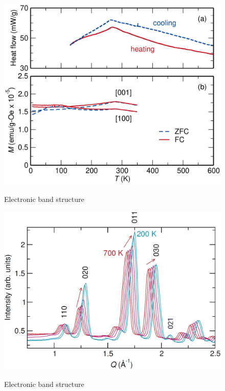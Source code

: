 \documentclass[11pt,edeposit,draftthesis]{uiucthesis2020}
\begin{document}
\begin{mainmatter}
\begin{figure}
\centering\includegraphics[width=\columnwidth]{figures/ch5/dsc-mpms_norm_cropped.pdf} \\
\caption{\label{fig:dsc_mpms}
Electronic band structure
}
\end{figure}

\begin{figure}
\centering\includegraphics[width=\columnwidth]{figures/ch5/WAND_data.png} \\
\caption{\label{fig:WAND_data}
Electronic band structure
}
\end{figure}


\end{mainmatter}
\end{document}
